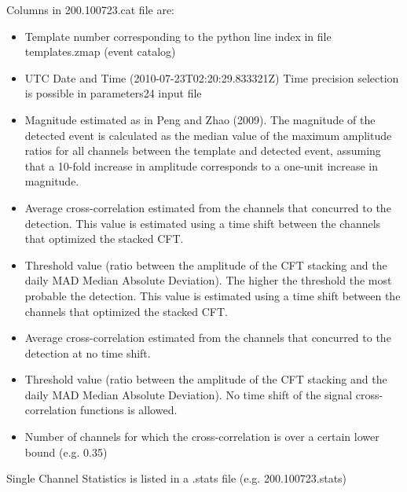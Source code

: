 \documentclass[a4paper,10pt,english]{sphinxmanual}
\begin{document}
Columns in 200.100723.cat file are:
\begin{itemize}
\item {} 
Template number corresponding to the python line index in file templates.zmap (event catalog)

\item {} 
UTC Date and Time (2010-07-23T02:20:29.833321Z) Time precision selection is possible in parameters24 input file

\item {} 
Magnitude estimated as in Peng and Zhao (2009). The magnitude of the detected event is calculated as the median value of the maximum amplitude ratios for all channels between the template and detected event, assuming that a 10-fold increase in amplitude corresponds to a one-unit increase in magnitude.

\item {} 
Average cross-correlation estimated from the channels that concurred to the detection. This value is estimated using a time shift between the channels that optimized the stacked CFT.

\item {} 
Threshold value (ratio between the amplitude of the CFT stacking and the daily MAD Median Absolute Deviation). The higher the threshold the most probable the detection. This value is estimated using a time shift between the channels that optimized the stacked CFT.

\item {} 
Average cross-correlation estimated from the channels that concurred to the detection at no time shift.

\item {} 
Threshold value (ratio between the amplitude of the CFT stacking and the daily MAD Median Absolute Deviation). No time shift of the signal cross-correlation functions is allowed.

\item {} 
Number of channels for which the cross-correlation is over a certain lower bound (e.g. 0.35)

\end{itemize}

Single Channel Statistics is listed in a .stats file (e.g. 200.100723.stats)

\begin{sphinxVerbatim}[commandchars=\\\{\}]

\end{sphinxVerbatim}
\end{document}
